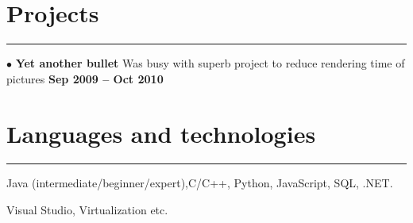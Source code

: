 \section{Projects}
\noindent\rule{\textwidth}{\hlinewidth}
    $\bullet$ \textbf{Yet another bullet}
    Was busy with superb project to reduce rendering time of pictures
\hfill\textbf{Sep 2009 -- Oct 2010}\\
\section{Languages and technologies}

\noindent\rule{\textwidth}{\hlinewidth}
    \begin{innerlist}
        \item Java (intermediate/beginner/expert),C/C++, Python, JavaScript, SQL, .NET.
        \item Visual Studio, Virtualization etc.
    \end{innerlist}

